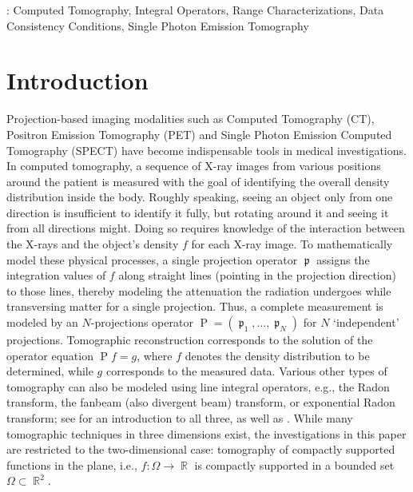 \documentclass[12pt]{article}
\DeclareMathOperator{\RR}{{\mathbb{R}}}
\DeclareMathOperator{\Projind}{\mathfrak{p}}
\DeclareMathOperator{\Projbasic}{P}
\begin{document}
%
\vspace{2pc}
: Computed Tomography, Integral Operators, Range Characterizations,  Data Consistency Conditions, Single Photon Emission Tomography
\newpage
%
%
% 
%




\section{Introduction}
\label{section_introduction}
Projection-based imaging modalities such as Computed Tomography (CT), Positron Emission Tomography (PET) and Single Photon Emission Computed Tomography (SPECT) \cite{ Deans_Radon_applications_1993,BLOKLAND200270,
Emissiontomo_2005, Ammari08_book_methematics_of_medical_imaging, Hsieh_CT_principles} have become indispensable tools in medical investigations.
In computed tomography, a sequence of X-ray images from various positions around the patient is measured with the goal of identifying the overall density distribution inside the body. Roughly speaking, seeing an object only from one direction is insufficient  to identify it fully, but rotating around it and seeing it from all directions might. Doing so requires knowledge of the interaction between the X-rays and the object's density $f$ for each X-ray image. To mathematically model these physical processes, a single projection operator $\Projind$ assigns the integration values of $f$ along straight lines (pointing in the projection direction) to those lines, thereby modeling the attenuation the radiation undergoes while transversing matter for a single projection. Thus, a complete measurement is modeled by an $N$-projections operator $\Projbasic=(\Projind_1,\dots, \Projind_N)$ for $N$ `independent' projections.
Tomographic reconstruction corresponds to the solution of the operator equation $\Projbasic f =g$, where $f$ denotes the density distribution to be determined, while $g$ corresponds to the measured data. 
Various other types of tomography can also be modeled using line integral operators, e.g., the Radon transform, the fanbeam (also divergent beam) transform, or exponential Radon transform; see  \cite[Chapter II]{Natterer:2001:MCT:500773} for an introduction to all three, as well as  \cite{Deans_Radon_applications_1993,V_Aguilar_1995}. 
While many tomographic techniques in three dimensions exist,
the investigations in this paper are restricted to the two-dimensional case: tomography of compactly supported functions in the plane, i.e., $f\colon \Omega\to \RR$ is compactly supported in a bounded set $\Omega\subset \RR^2$.
\end{document}

